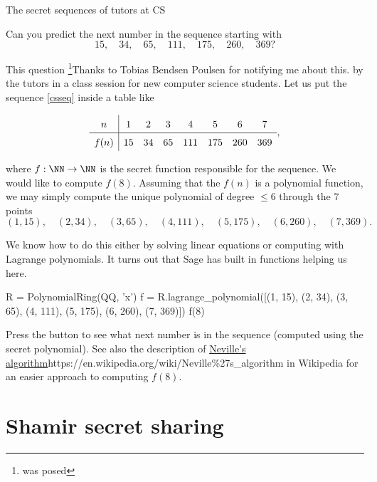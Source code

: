 \documentclass{article}
\begin{document}
\begin{hideinbutton}{The secret sequences of tutors at CS}

Can you predict the next number in the sequence starting with
\begin{equation}\label{csseq}
15,\quad 34,\quad 65,\quad 111,\quad 175,\quad 260,\quad 369?
\end{equation}

This question \footnote{was posed}{Thanks to Tobias Bendsen Poulsen for notifying me about this.} by the tutors in a class session for new computer science students. Let us put the sequence \eqref{csseq} inside a table like

$$
\def\arraystretch{1.5}
\begin{array}{c|ccccccc}
n & 1 & 2 & 3 & 4 & 5 & 6 & 7\\ \hline
f(n) & 15 & 34 & 65 & 111 & 175 & 260 & 369
\end{array},
$$

where $f:\NN\rightarrow \NN$ is the secret function responsible for the sequence. We would like to compute $f(8)$. Assuming that the $f(n)$ is a polynomial function, we may simply compute the unique polynomial of  degree $\leq 6$ through the $7$ points
$$
(1, 15),\quad (2, 34),\quad (3, 65),\quad (4, 111),\quad (5, 175),\quad (6, 260),\quad (7, 369).
$$

We know how to do this either by solving linear equations or computing with Lagrange polynomials. It turns out that Sage has built in functions helping us here.

\begin{sage}
R = PolynomialRing(QQ, 'x')
f = R.lagrange_polynomial([(1, 15), (2, 34), (3, 65), (4, 111), (5, 175), (6, 260), (7, 369)])
f(8)
\end{sage}

Press the button to see what next number is in the sequence (computed using the secret polynomial). See also the
description of \url{Neville's algorithm}{https://en.wikipedia.org/wiki/Neville\%27s_algorithm} in Wikipedia for an easier approach to
computing $f(8)$.


\end{hideinbutton}

\section{Shamir secret sharing}
\end{document}
